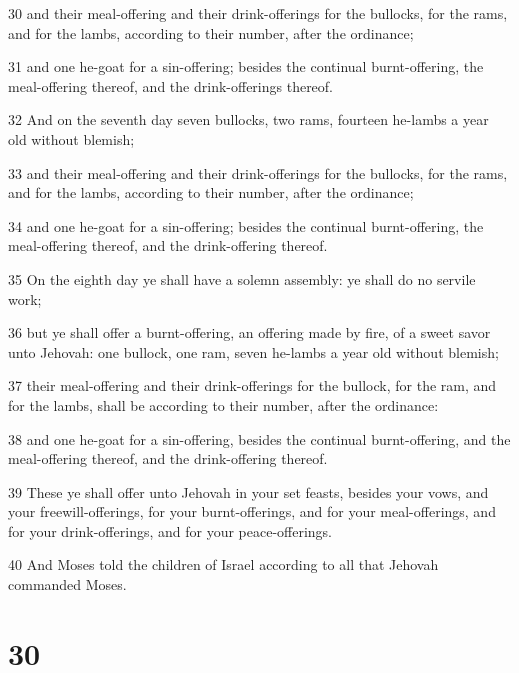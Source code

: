 \par 30 and their meal-offering and their drink-offerings for the bullocks, for the rams, and for the lambs, according to their number, after the ordinance;
\par 31 and one he-goat for a sin-offering; besides the continual burnt-offering, the meal-offering thereof, and the drink-offerings thereof.
\par 32 And on the seventh day seven bullocks, two rams, fourteen he-lambs a year old without blemish;
\par 33 and their meal-offering and their drink-offerings for the bullocks, for the rams, and for the lambs, according to their number, after the ordinance;
\par 34 and one he-goat for a sin-offering; besides the continual burnt-offering, the meal-offering thereof, and the drink-offering thereof.
\par 35 On the eighth day ye shall have a solemn assembly: ye shall do no servile work;
\par 36 but ye shall offer a burnt-offering, an offering made by fire, of a sweet savor unto Jehovah: one bullock, one ram, seven he-lambs a year old without blemish;
\par 37 their meal-offering and their drink-offerings for the bullock, for the ram, and for the lambs, shall be according to their number, after the ordinance:
\par 38 and one he-goat for a sin-offering, besides the continual burnt-offering, and the meal-offering thereof, and the drink-offering thereof.
\par 39 These ye shall offer unto Jehovah in your set feasts, besides your vows, and your freewill-offerings, for your burnt-offerings, and for your meal-offerings, and for your drink-offerings, and for your peace-offerings.
\par 40 And Moses told the children of Israel according to all that Jehovah commanded Moses.

\chapter{30}

